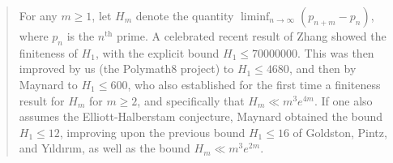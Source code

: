 \documentclass{bmcart}
\theoremstyle{plain}
\theoremstyle{definition}
\begin{document}
\begin{frontmatter}
\begin{fmbox}

\end{fmbox}%


\begin{abstractbox}

\begin{abstract} %
For any $m \geq 1$, let $H_m$ denote the quantity $\liminf_{n \to \infty} (p_{n+m}-p_n)$, where $p_n$ is the $n^{\operatorname{th}}$ prime. A celebrated recent result of Zhang showed the finiteness of $H_1$, with the explicit bound $H_1 \leq 70000000$. This was then improved by us (the Polymath8 project) to $H_1 \leq 4680$, and then by Maynard to $H_1 \leq 600$, who also established for the first time a finiteness result for $H_m$ for $m \geq 2$, and specifically that $H_m \ll m^3 e^{4m}$. If one also assumes the Elliott-Halberstam conjecture, Maynard obtained the bound $H_1 \leq 12$, improving upon the previous bound $H_1 \leq 16$ of Goldston, Pintz, and Y{\i}ld{\i}r{\i}m, as well as the bound $H_m \ll m^3 e^{2m}$.


\end{abstract}
\end{abstractbox}
\end{frontmatter}
\end{document}
